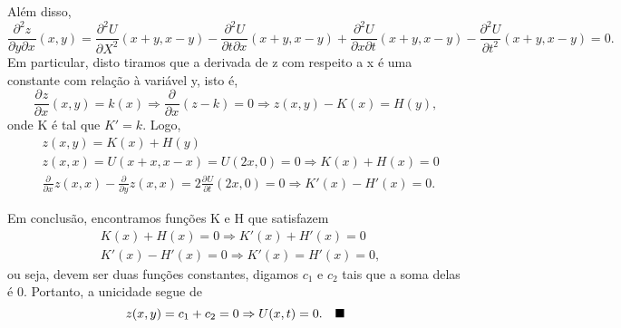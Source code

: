 \documentclass[../pde_notes.tex]{subfiles}
\begin{document}
\begin{proof*}
	Além disso,
	\[
		\frac{\partial^{2}z}{\partial y \partial x^{}}(x, y) = \frac{\partial^{2}U}{\partial X^{2}}(x+y, x-y) - \frac{\partial^{2}U}{\partial t \partial x^{}}(x+y, x-y) + \frac{\partial^{2}U}{\partial x \partial t^{}}(x+y, x-y) - \frac{\partial^{2}U}{\partial t^{2}}(x+y, x-y) = 0.
	\]
	Em particular, disto tiramos que a derivada de z com respeito a x é uma constante com relação à variável y, isto é,
	\[
		\frac{\partial^{}z}{\partial x^{}}(x, y) = k(x) \Rightarrow \frac{\partial^{}}{\partial x^{}}(z - k) = 0 \Rightarrow z(x, y) - K(x) = H(y),
	\]
	onde K é tal que \(K' = k\). Logo,
	\begin{align*}
		 & z(x, y) = K(x) + H(y)                                                                                                                                               \\
		 & z(x, x) = U(x+x, x-x) = U(2x, 0) = 0 \Rightarrow K(x) + H(x) = 0                                                                                                    \\
		 & \frac{\partial^{}}{\partial x^{}}z(x, x) - \frac{\partial^{}}{\partial y^{}}z(x, x) = 2\frac{\partial^{}U}{\partial t^{}}(2x, 0) = 0 \Rightarrow K'(x) - H'(x) = 0.
	\end{align*}

	Em conclusão, encontramos funções K e H que satisfazem
	\begin{align*}
		 & K(x) + H(x) = 0 \Rightarrow K'(x) + H'(x) = 0    \\
		 & K'(x) - H'(x) = 0 \Rightarrow K'(x) = H'(x) = 0,
	\end{align*}
	ou seja, devem ser duas funções constantes, digamos \(c_1\) e \(c_2\) tais que a soma delas é 0. Portanto, a unicidade segue de
	\[
		z(x, y) = c_1 + c_2 = 0 \Rightarrow U(x, t) = 0. \quad \text{$\blacksquare$}
	\]
\end{proof*}
\end{document}
